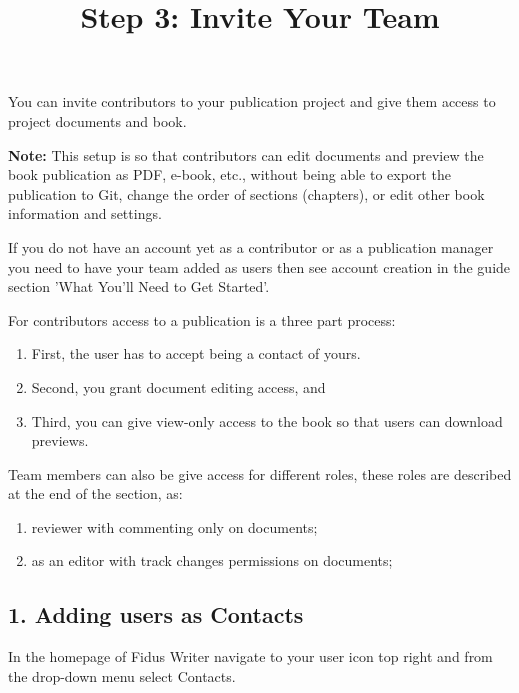 \documentclass{article}
\begin{document}
\title{Step 3: Invite Your Team}

\maketitle


You can invite contributors to your publication project and give them access to project documents and book.


\textbf{Note:} This setup is so that contributors can edit documents and preview the book publication as PDF, e-book, etc., without being able to export the publication to Git, change the order of sections (chapters), or edit other book information and settings.


If you do not have an account yet as a contributor or as a publication manager you need to have your team added as users then see account creation in the guide section 'What You'll Need to Get Started'.


For contributors access to a publication is a three part process:

\begin{enumerate}
\item First, the user has to accept being a contact of yours.


\item Second, you grant document editing access, and 


\item Third, you can give view-only access to the book so that users can download previews.  


\end{enumerate}

Team members can also be give access for different roles, these roles are described at the end of the section, as:

\begin{enumerate}
\item reviewer with commenting only on documents; 


\item as an editor with track changes permissions on documents;


\end{enumerate}

\subsection{1. Adding users as Contacts}\label{H3777938}



In the homepage of Fidus Writer navigate to your user icon top right and from the drop-down menu select Contacts.
\end{document}
